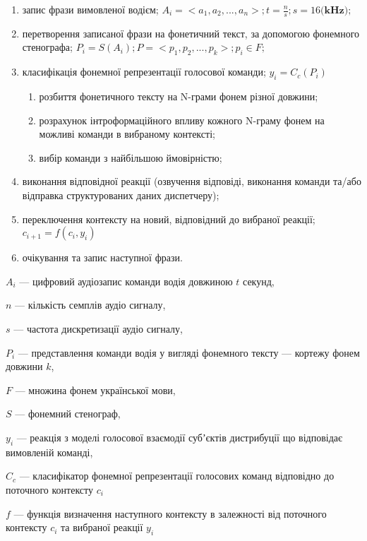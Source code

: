 \begin{enumerate}
	\item запис фрази вимовленої водієм; $A_i=<a_1,a_2,...,a_n>; t=\frac{n}{s}; s=16 \textbf{(kHz)};$
	\item перетворення записаної фрази на фонетичний текст, за допомогою фонемного стенографа; $P_i=S(A_i); P=<p_1,p_2,...,p_k>; p_i \in F;$
	\item класифікація фонемної репрезентації голосової команди; $y_i=C_c(P_i)$
	\begin{enumerate}
		\item розбиття фонетичного тексту на N-грами фонем різної довжини;
		\item розрахунок інтроформаційного впливу кожного N-граму фонем на можливі команди в вибраному контексті;
		\item вибір команди з найбільшою ймовірністю;
	\end{enumerate}
	\item виконання відповідної реакції (озвучення відповіді, виконання команди та/або відправка структурованих даних диспетчеру);
	\item переключення контексту на новий, відповідний до вибраної реакції; $c_{i+1} = f(c_i, y_i)$
	\item очікування та запис наступної фрази.
\end{enumerate}

{\settowidth{\leftskip}{Де:\ }
	
	$A_i$ --- цифровий аудіозапис команди водія довжиною $t$ секунд,
	
	$n$ --- кількість семплів аудіо сигналу,
	
	$s$ --- частота дискретизації аудіо сигналу,
	
	$P_i$ --- представлення команди водія у вигляді фонемного тексту --- кортежу фонем довжини $k$,
	
	$F$ --- множина фонем української мови,
	
	$S$ --- фонемний стенограф,
	
	$y_i$ --- реакція з моделі голосової взаємодії субʼєктів дистрибуції що відповідає вимовленій команді,
	
	$C_c$ --- класифікатор фонемної репрезентації голосових команд відповідно до поточного контексту $c_i$
	
	$f$ --- функція визначення наступного контексту в залежності від поточного контексту $c_i$ та вибраної реакції $y_i$
	
}

